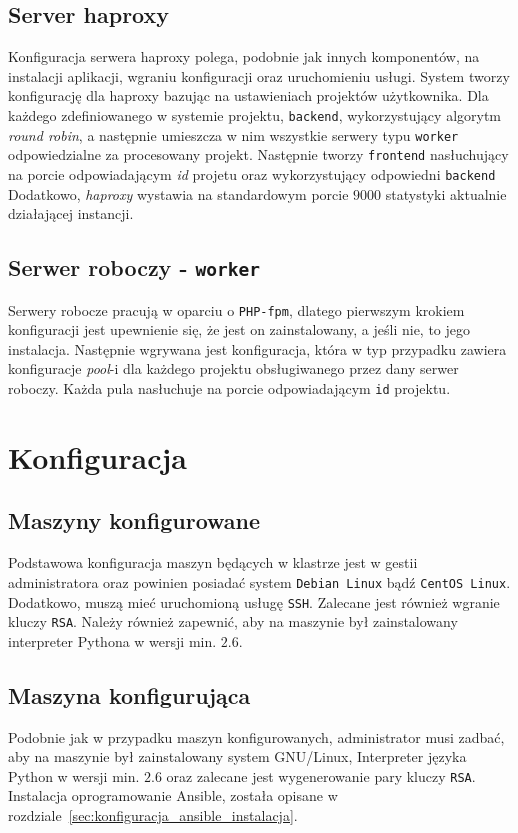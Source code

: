 \subsection{Server haproxy}
Konfiguracja serwera haproxy polega, podobnie jak innych komponentów, na instalacji aplikacji, wgraniu konfiguracji oraz uruchomieniu usługi.
System tworzy konfigurację dla haproxy bazując na ustawieniach projektów użytkownika.
Dla każdego zdefiniowanego w systemie projektu, \texttt{backend}, wykorzystujący algorytm \textit{round robin}, a następnie umieszcza w nim wszystkie serwery typu \texttt{worker} odpowiedzialne za procesowany projekt.
Następnie tworzy \texttt{frontend} nasłuchujący na porcie odpowiadającym \textit{id} projetu oraz wykorzystujący odpowiedni \texttt{backend}\\
Dodatkowo, \textit{haproxy} wystawia na standardowym porcie $9000$ statystyki aktualnie działającej instancji.
\subsection{Serwer roboczy - \texttt{worker}}
Serwery robocze pracują w oparciu o \texttt{PHP-fpm}, dlatego pierwszym krokiem konfiguracji jest upewnienie się, że jest on zainstalowany, a jeśli nie, to jego instalacja.
Następnie wgrywana jest konfiguracja, która w typ przypadku zawiera konfiguracje \textit{pool}-i dla każdego projektu obsługiwanego przez dany serwer roboczy.
Każda pula nasłuchuje na porcie odpowiadającym \texttt{id} projektu.
\section{Konfiguracja}
\subsection{Maszyny konfigurowane}
Podstawowa konfiguracja maszyn będących w klastrze jest w gestii administratora oraz powinien posiadać system \texttt{Debian Linux} bądź \texttt{CentOS Linux}.
Dodatkowo, muszą mieć uruchomioną usługę \texttt{SSH}.
Zalecane jest również wgranie kluczy \texttt{RSA}.
Należy również zapewnić, aby na maszynie był zainstalowany interpreter Pythona w wersji min. $2.6$.
\subsection{Maszyna konfigurująca}
Podobnie jak w przypadku maszyn konfigurowanych, administrator musi zadbać, aby na maszynie był zainstalowany system GNU/Linux, Interpreter języka Python w wersji min. $2.6$ oraz zalecane jest wygenerowanie pary kluczy \texttt{RSA}.
Instalacja oprogramowanie Ansible, została opisane w rozdziale~\ref{sec:konfiguracja_ansible_instalacja}.
